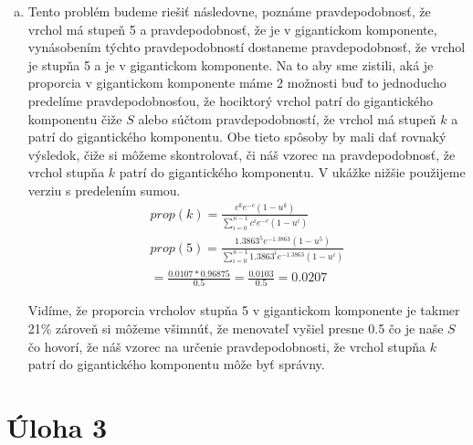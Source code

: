 \documentclass[a4paper]{article}
\begin{document}
\begin{enumerate}[(a)]
	\item 
	Tento problém budeme riešiť následovne, poznáme pravdepodobnosť, že vrchol má stupeň 5 a pravdepodobnosť, že je v gigantickom komponente, vynásobením týchto pravdepodobností dostaneme pravdepodobnosť, že vrchol je stupňa 5 a je v gigantickom komponente. Na to aby sme zistili, aká je proporcia v gigantickom komponente máme 2 možnosti buď to jednoducho predelíme pravdepodobnosťou, že hociktorý vrchol patrí do gigantického komponentu čiže $S$ alebo súčtom pravdepodobností, že vrchol má stupeň $k$ a patrí do gigantického komponentu. Obe tieto spôsoby by mali dať rovnaký výsledok, čiže si môžeme skontrolovať, či náš vzorec na pravdepodobnosť, že vrchol stupňa $k$ patrí do gigantického komponentu. V ukážke nižšie použijeme verziu s predelením sumou.
	\begin{gather*}
		prop(k) = \frac{c^{k}e^{-c}(1-u^k)}{\sum_{i=0}^{n-1}c^{i}e^{-c}(1-u^i)} \\
		prop(5) = \frac{1.3863^{5}e^{-1.3863}(1-u^5)}{\sum_{i=0}^{n-1}1.3863^{i}e^{-1.3863}(1-u^i)} \\
		= \frac{0.0107*0.96875}{0.5} = \frac{0.0103}{0.5} = 0.0207
	\end{gather*}
	 
	Vidíme, že proporcia vrcholov stupňa 5 v gigantickom komponente je takmer 21\% zároveň si môžeme všimnúť, že menovateľ vyšiel presne 0.5 čo je naše $S$ čo hovorí, že náš vzorec na určenie pravdepodobnosti, že vrchol stupňa $k$ patrí do gigantického komponentu môže byť správny.
	
\end{enumerate}
 
\section{Úloha 3}
\end{document}
